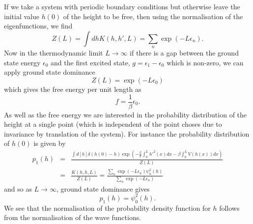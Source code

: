 If we take a system with periodic boundary conditions but otherwise leave the initial value $h(0)$ of the height to be free, then using the normalisation of the eigenfunctions, we find
\begin{equation}
    Z(L) = \int dh K(h,h',L) = \sum_n \exp(-L\epsilon_n).
\end{equation}
Now in the thermodynamic limit $L\to\infty$ if there is a gap between the ground state energy
$\epsilon_0$ and the first excited state, $g=\epsilon_1-\epsilon_0$ which is non-zero, we can apply ground state dominance 
\begin{equation}
    Z(L) =\exp(-L\epsilon_0)
\end{equation}
which gives the free energy per unit length as
\begin{equation}
    f=\frac{1}{\beta}\epsilon_0.
\end{equation}
As well as the free energy we are interested in the probability distribution of the height at a single point (which is independent of the point choses due to invariance by translation of the system). For instance the probability distribution of $h(0)$ is given by
\begin{eqnarray}
p_1(h)&=& \frac{\int d[h]\delta(h(0)-h)\exp\left(-\frac{\beta}{2}\int_0^L h'^2(x) dx -\beta\int_0^L  V(h(x)) dx\right)}{Z(L)}\\
&=& \frac{K(h,h,L)}{Z(L)}=\frac{\sum_n \exp(-L\epsilon_n)\psi_n^2(h)}{\sum_n \exp(-L\epsilon_n)}
\end{eqnarray}
and so as $L\to\infty$, ground state dominance gives
\begin{equation}
    p_1(h)= \psi_0^2(h).
\end{equation}
We see that the normalisation of the probability density function for $h$ follows from the 
normalisation of the wave functions.

